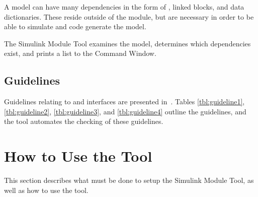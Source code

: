 \documentclass{article}
\makeatletter
\newcommand{\ToolName}{Simulink Module Tool\@\xspace}
\makeatother
\begin{document}
A \Simulink model can have many dependencies in the form of , \library linked blocks, and data dictionaries. These reside outside of the \Simulink module, but are necessary in order to be able to simulate and code generate the model.

The \ToolName examines the model, determines which dependencies exist, and prints a list to the Command Window.

\subsection{Guidelines}
Guidelines relating to  and interfaces are presented in~\cite{paper}. Tables \ref{tbl:guideline1}, \ref{tbl:guideline2}, \ref{tbl:guideline3}, and \ref{tbl:guideline4} outline the guidelines, and the tool automates the checking of these guidelines.



%

\newpage	
\section{How to Use the Tool}
This section describes what must be done to setup the \ToolName, as well as how to use the tool.

\end{document}
